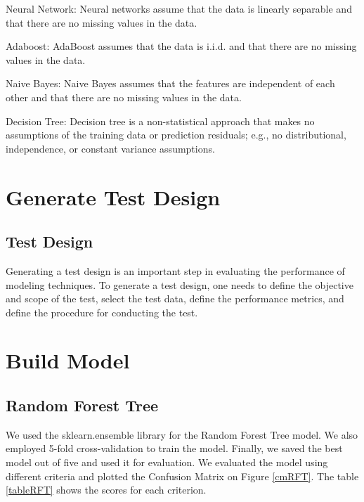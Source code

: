 Neural Network: Neural networks assume that the data is linearly separable and that there are no missing values in the data.

Adaboost: AdaBoost assumes that the data is i.i.d. and that there are no missing values in the data.

Naive Bayes: Naive Bayes assumes that the features are independent of each other and that there are no missing values in the data.

Decision Tree: Decision tree is a non-statistical approach that makes no assumptions of the training data or prediction residuals; e.g., no distributional, independence, or constant variance assumptions.


\section{Generate Test Design}

\subsection{Test Design}
Generating a test design is an important step in evaluating the performance of modeling techniques. To generate a test design, one needs to define the objective and scope of the test, select the test data, define the performance metrics, and define the procedure for conducting the test.

\section{Build Model}  

\subsection{Random Forest Tree}



We used the sklearn.ensemble library for the Random Forest Tree model. We also employed 5-fold cross-validation to train the model. Finally, we saved the best model out of five and used it for evaluation.
We evaluated the model using different criteria and plotted the Confusion Matrix on Figure \ref{cmRFT}. The table \ref{tableRFT} shows the scores for each criterion.
  

